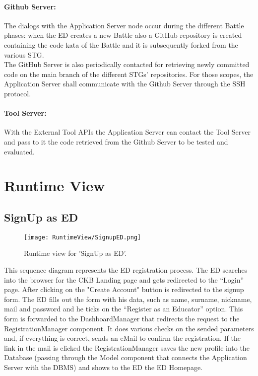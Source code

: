 \paragraph{Github Server:}
The dialogs with the Application Server node occur during the different Battle phases: when the ED creates a new Battle also a GitHub repository is created containing the code kata of the Battle and it is subsequently forked from the various STG.\\
The GitHub Server is also periodically contacted for retrieving newly committed code on the main branch of the different STGs' repositories.
For those scopes, the Application Server shall communicate with the Github Server through the SSH protocol.


\paragraph{Tool Server:}
With the External Tool APIs the Application Server can contact the Tool Server and pass to it the code retrieved from the Github Server to be tested and evaluated.

\newpage
\section{Runtime View}
\label{sec:runtime_view}%

\subsection{SignUp as ED}
\begin{figure}[H]
    \begin{center}
        \texttt{[image: RuntimeView/SignupED.png]}
        \caption{Runtime view for 'SignUp as ED'.}
        \label{fig:runtime_signupasED}%
    \end{center}
\end{figure}

This sequence diagram represents the ED registration process.
The ED searches into the browser for the CKB Landing page and gets redirected to the “Login” page. After clicking on the "Create Account" button is redirected to the signup form. The ED fills out the form with his data, such as name, surname, nickname, mail and password and he ticks on the “Register as an Educator” option.
This form is forwarded to the DashboardManager that redirects the request to the RegistrationManager component. It does various checks on the sended parameters and, if everything is correct, sends an eMail to confirm  the registration. If the link in the mail is clicked the RegistrationManager saves the new profile into the Database (passing through the Model component that connects the Application Server with the DBMS) and shows to the ED the ED Homepage.


